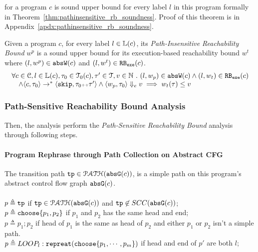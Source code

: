for a program $c$ is sound upper bound for every label $l$ in this program formally in Theorem~\ref{thm:pathinsensitive_rb_soundness}. Proof of this theorem is in Appendix~\ref{apdx:pathinsensitive_rb_soundness}.
%
\begin{thm}
  \label{thm:pathinsensitive_rb_soundness}
Given a program ${c}$, for every label $l \in \mathbb{L}(c)$,
its \emph{Path-Insensitive Reachability Bound} $w^p$ 
 is a sound upper bound for its 
 execution-based reachability bound $w^t$ 
 where $(l, w^p) \in \mathtt{abs}{\mathtt{W}}(c)$ and  $(l, w^t) \in \mathtt{RB_{exe}}(c)$.
  \[
    \begin{array}{l}
      \forall c \in \mathcal{C}, l \in \mathbb{L}(c),\mathtt{\tau}_0 \in \mathcal{T}_0(c), 
      \mathtt{\tau}' \in \mathcal{T}, v \in \mathbb{N}
       ~.~ 
      (l, w_p) \in \mathtt{abs}{\mathtt{W}}(c)
      \land 
      (l, w_t) \in \mathtt{RB_{exe}}(c)
      \\ \quad
      \land \langle {c}, \mathtt{\tau}_0 \rangle \to^{*} \langle \mathtt{skip}, \mathtt{\tau}_0{\scriptscriptstyle ++}\mathtt{\tau}' \rangle 
      \land 
      \langle w_{p}, \mathtt{\tau}_0 \rangle \Downarrow_e v
      \implies
      w_{t}(\mathtt{\tau}) \leq v
    \end{array}
    \]
\end{thm}

\subsubsection{Path-Sensitive Reachability Bound Analysis}
\label{sec:path_sensitive_rb}
Then, the analysis perform the \emph{Path-Sensitive Reachability Bound} analysis through following steps.
%
\paragraph*{Program Rephrase through Path Collection on Abstract CFG}
The transition path
$\mathtt{tp} \in \mathcal{PATH}(\mathtt{abs}{\mathtt{G}}(c))$, is a simple path on this program's abstract control flow graph $\mathtt{abs}{\mathtt{G}}(c)$.
\\
\\
$p \triangleq \mathtt{tp} $ if $\mathtt{tp} \in \mathcal{PATH}(\mathtt{abs}{\mathtt{G}}(c))$ and $\mathtt{tp} \not\in SCC(\mathtt{abs}{\mathtt{G}}(c))$;
\\
$p \triangleq \mathtt{choose}\{p_1, p_2 \}$ if $p_1$ and $p_2$ has the same head and end;
\\
$p \triangleq p_1; p_2$ if head of $p_1$ is the same as head of $p_2$ and either $p_1$ or $p_2$ isn't a simple path. 
\\
$p \triangleq LOOP_l : \mathtt{repreat}(\mathtt{choose}\{p_1, \cdots, p_m\})$ if head and end of $p'$ are both $l$;
%
